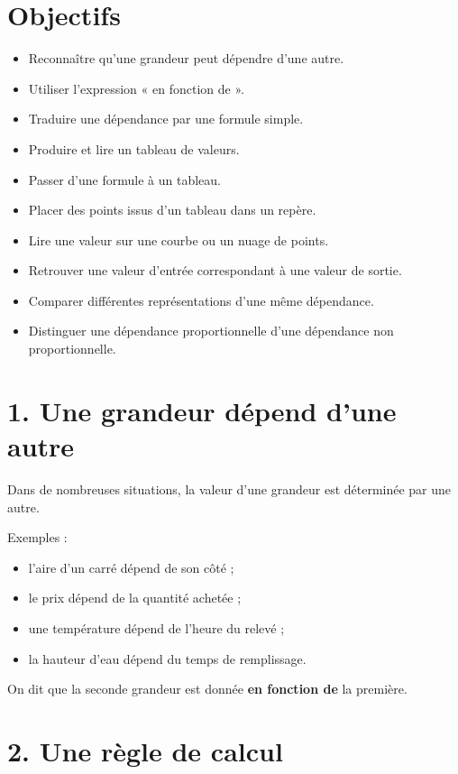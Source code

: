
\section{Objectifs}

\begin{itemize}
\item Reconnaître qu'une grandeur peut dépendre d'une autre.
\item Utiliser l'expression « en fonction de ».
\item Traduire une dépendance par une formule simple.
\item Produire et lire un tableau de valeurs.
\item Passer d'une formule à un tableau.
\item Placer des points issus d'un tableau dans un repère.
\item Lire une valeur sur une courbe ou un nuage de points.
\item Retrouver une valeur d'entrée correspondant à une valeur de sortie.
\item Comparer différentes représentations d'une même dépendance.
\item Distinguer une dépendance proportionnelle d'une dépendance non proportionnelle.
\end{itemize}

\section{1. Une grandeur dépend d'une autre}

Dans de nombreuses situations, la valeur d'une grandeur est déterminée par une autre.

Exemples :
\begin{itemize}
\item l'aire d'un carré dépend de son côté ;
\item le prix dépend de la quantité achetée ;
\item une température dépend de l'heure du relevé ;
\item la hauteur d'eau dépend du temps de remplissage.
\end{itemize}

On dit que la seconde grandeur est donnée \textbf{en fonction de} la première.

\section{2. Une règle de calcul}

